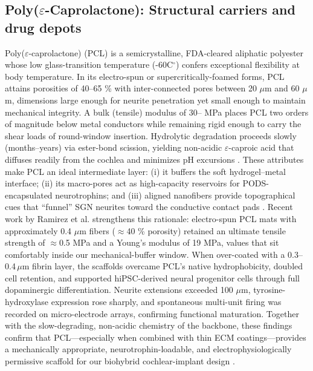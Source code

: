 \documentclass[referee,pdflatex, sn-vancouver-num]{sn-jnl}%
\theoremstyle{thmstyleone}%
\theoremstyle{thmstyletwo}%
\theoremstyle{thmstylethree}%
\DeclareRobustCommand{\textendash}{\ifmmode\text{-}\else\leavevmode\hbox{--}\fi}
\begin{document}
\subsection{Poly(\texorpdfstring{$\varepsilon$}{epsilon}-Caprolactone): Structural carriers and drug depots}
Poly($\varepsilon$-caprolactone) (PCL) is a semicrystalline, FDA-cleared aliphatic polyester whose low glass-transition temperature (-60C$^{\circ}$) confers exceptional flexibility at body temperature. In its electro-spun or supercritically-foamed forms, PCL attains porosities of 40–65 \% with inter-connected pores between 20 $\mu$m and 60 $\mu$m, dimensions large enough for neurite penetration yet small enough to maintain mechanical integrity. A bulk (tensile) modulus of 30\textendash 60 MPa places PCL two orders of magnitude below metal conductors while remaining rigid enough to carry the shear loads of round-window insertion. Hydrolytic degradation proceeds slowly (months–years) via ester-bond scission, yielding non-acidic $\varepsilon$-caproic acid that diffuses readily from the cochlea and minimizes pH excursions \cite{Chen2024_NatRevBioeng}. These attributes make PCL an ideal intermediate layer: (i) it buffers the soft hydrogel–metal interface; (ii) its macro-pores act as high-capacity reservoirs for PODS-encapsulated neurotrophins; and (iii) aligned nanofibers provide topographical cues that “funnel” SGN neurites toward the conductive contact pads \cite{Pandey2023_MRSC_CHReview}. Recent work by Ramirez et al. \cite{Ramirez2024} strengthens this rationale: electro-spun PCL mats with approximately 0.4 $\mu$m fibers ($\approx$40 \% porosity) retained an ultimate tensile strength of $\approx$0.5 MPa and a Young’s modulus of 19 MPa, values that sit comfortably inside our mechanical-buffer window. When over-coated with a 0.3–0.4\,$\mu$m fibrin layer, the scaffolds overcame PCL’s native hydrophobicity, doubled cell retention, and supported hiPSC-derived neural progenitor cells through full dopaminergic differentiation. Neurite extensions exceeded 100 $\mu$m, tyrosine-hydroxylase expression rose sharply, and spontaneous multi-unit firing was recorded on micro-electrode arrays, confirming functional maturation. Together with the slow-degrading, non-acidic chemistry of the backbone, these findings confirm that PCL—especially when combined with thin ECM coatings—provides a mechanically appropriate, neurotrophin-loadable, and electrophysiologically permissive scaffold for our biohybrid cochlear-implant design \cite{Li2007,Friend2011}.
\end{document}
